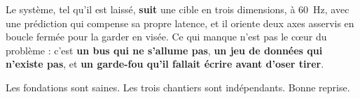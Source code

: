 \documentclass[11pt,a4paper]{article}
\begin{document}
\vspace{1cm}
\begin{note}
Le système, tel qu'il est laissé, \textbf{suit} une cible en trois dimensions, à 60~Hz, avec
une prédiction qui compense sa propre latence, et il oriente deux axes asservis en boucle
fermée pour la garder en visée. Ce qui manque n'est pas le c\oe ur du problème : c'est
\textbf{un bus qui ne s'allume pas}, \textbf{un jeu de données qui n'existe pas}, et
\textbf{un garde-fou qu'il fallait écrire avant d'oser tirer}.

Les fondations sont saines. Les trois chantiers sont indépendants. Bonne reprise.
\end{note}

\newpage


\end{document}
